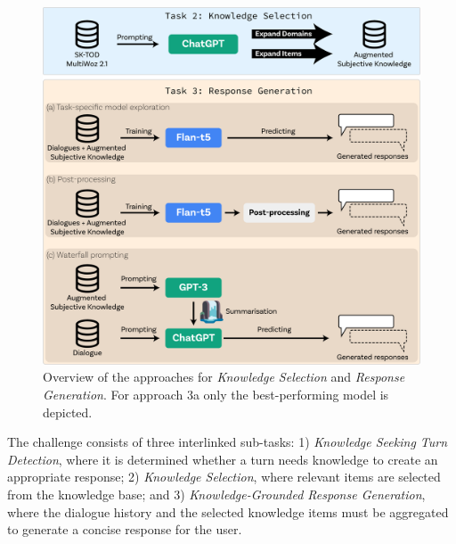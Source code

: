 \documentclass[11pt]{article}
\begin{document}
\begin{figure}[htp]
    \centering
    \includegraphics[width=\columnwidth]{images/draft_2.pdf}
    \caption{Overview of the approaches for \textit{Knowledge Selection} and \textit{Response Generation}. For approach 3a only the best-performing model is depicted.}
    \label{fig:approaches}
\end{figure}

The challenge consists of three interlinked sub-tasks: 1) \textit{Knowledge Seeking Turn Detection}, where it is determined whether a turn needs knowledge to create an appropriate response; 2) \textit{Knowledge Selection}, where relevant items are selected from the knowledge base; and 3) \textit{Knowledge-Grounded Response Generation}, where the dialogue history and the selected knowledge items must be aggregated to generate a concise response for the user.
\end{document}
